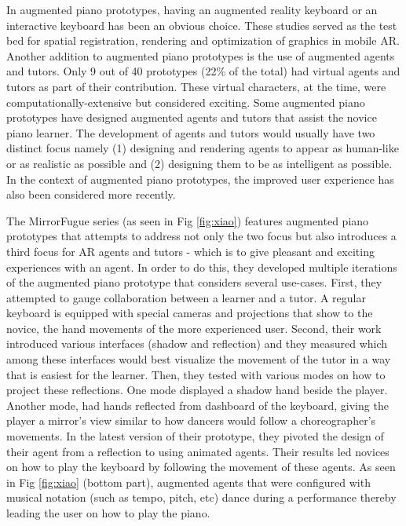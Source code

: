 \documentclass[sigchi, review]{acmart}
\begin{document}
In augmented piano prototypes, having an augmented reality keyboard or an interactive keyboard has been an obvious choice. These studies served as the test bed for spatial registration, rendering and optimization of graphics in mobile AR. Another addition to augmented piano prototypes is the use of augmented agents and tutors. Only 9 out of 40 prototypes (22\% of the total) had virtual agents and tutors as part of their contribution. These virtual characters, at the time, were computationally-extensive but considered exciting. Some augmented piano prototypes have designed augmented agents and tutors that assist the novice piano learner. The development of agents and tutors would usually have two distinct focus namely (1) designing and rendering agents to appear as human-like or as realistic as possible and (2) designing them to be as intelligent as possible. In the context of augmented piano prototypes, the improved user experience has also been considered more recently. 

The MirrorFugue series \cite{xiao2010mirrorfugue, xiao2011duet, xiao2013mirrorfugue, xiao2014andante} (as seen in Fig \ref{fig:xiao}) features augmented piano prototypes that attempts to address not only the two focus but also introduces a third focus for AR agents and tutors - which is to give pleasant and exciting experiences with an agent. In order to do this, they developed multiple iterations of the augmented piano prototype that considers several use-cases. First, they attempted to gauge collaboration between a learner and a tutor. A regular keyboard is equipped with special cameras and projections that show to the novice, the hand movements of the more experienced user. Second, their work introduced various interfaces (shadow and reflection) and they measured which among these interfaces would best visualize the movement of the tutor in a way that is easiest for the learner. Then, they tested with various modes on how to project these reflections. One mode displayed a shadow hand beside the player. Another mode, had hands reflected from dashboard of the keyboard, giving the player a mirror's view similar to how dancers would follow a choreographer's movements. In the latest version of their prototype, they pivoted the design of their agent from a reflection to using animated agents. Their results led novices on how to play the keyboard by following the movement of these agents. As seen in Fig \ref{fig:xiao} (bottom part), augmented agents that were configured with musical notation (such as tempo, pitch, etc) dance during a performance thereby leading the user on how to play the piano. 
\end{document}
